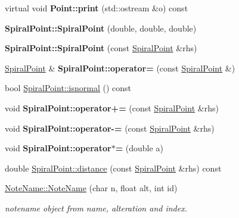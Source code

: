 \begin{DoxyCompactItemize}
\item 
\mbox{\label{group__segment_gaf6904981d6c631a7756499cd0b42ce29}} 
virtual void {\bfseries Point\+::print} (std\+::ostream \&o) const
\item 
\mbox{\label{group__segment_ga80277d41d835c643826b4e813490849a}} 
{\bfseries Spiral\+Point\+::\+Spiral\+Point} (double, double, double)
\item 
\mbox{\label{group__segment_gae521f98807e13c4e0019b561565cda18}} 
{\bfseries Spiral\+Point\+::\+Spiral\+Point} (const \mbox{\hyperlink{structSpiralPoint}{Spiral\+Point}} \&rhs)
\item 
\mbox{\label{group__segment_gab4085951f6e5264f912feadf327a8c81}} 
\mbox{\hyperlink{structSpiralPoint}{Spiral\+Point}} \& {\bfseries Spiral\+Point\+::operator=} (const \mbox{\hyperlink{structSpiralPoint}{Spiral\+Point}} \&)
\item 
bool \mbox{\hyperlink{group__segment_ga8d702bcd74b30d19929d1954087bd4b0}{Spiral\+Point\+::isnormal}} () const
\item 
\mbox{\label{group__segment_ga50ce60a751c8ad173a53ccee629a4598}} 
void {\bfseries Spiral\+Point\+::operator+=} (const \mbox{\hyperlink{structSpiralPoint}{Spiral\+Point}} \&rhs)
\item 
\mbox{\label{group__segment_ga81b9a0d474b385cf0335523d49cc9fc1}} 
void {\bfseries Spiral\+Point\+::operator-\/=} (const \mbox{\hyperlink{structSpiralPoint}{Spiral\+Point}} \&rhs)
\item 
\mbox{\label{group__segment_gaf7d46ab9c2b5dd8e11ec4a940dea3d03}} 
void {\bfseries Spiral\+Point\+::operator$\ast$=} (double a)
\item 
double \mbox{\hyperlink{group__segment_ga71dccd6f3dd14b2c497e4198ea37d745}{Spiral\+Point\+::distance}} (const \mbox{\hyperlink{structSpiralPoint}{Spiral\+Point}} \&rhs) const
\item 
\mbox{\hyperlink{group__segment_gad81fd626f6b9bc6d70fd5e235ec5c8cb}{Note\+Name\+::\+Note\+Name}} (char n, float alt, int id)
\begin{DoxyCompactList}\small\item\em notename object from name, alteration and index. \end{DoxyCompactList}\item 

\end{DoxyCompactItemize}
